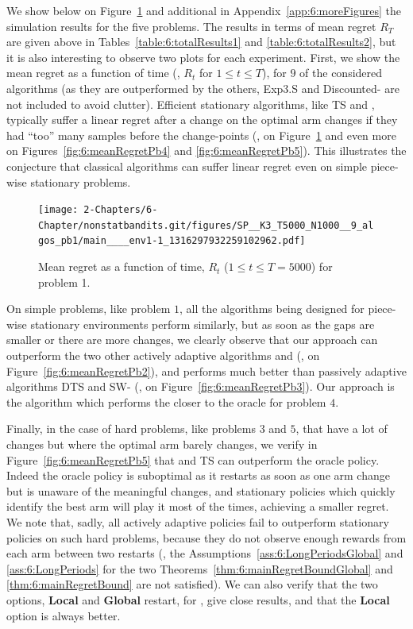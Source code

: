 We show below on Figure~\ref{fig:6:meanRegretPb1} and additional in Appendix~\ref{app:6:moreFigures} the simulation results for the five problems.
The results in terms of mean regret $R_T$ are given above in Tables~\ref{table:6:totalResults1} and \ref{table:6:totalResults2}, but it is also interesting to observe two plots for each experiment.
%
First, we show the mean regret as a function of time (\ie, $R_t$ for $1 \leq t \leq T$), for $9$ of the considered algorithms (as they are outperformed by the others, Exp3.S and Discounted-\klUCB{} are not included to avoid clutter).
%
Efficient stationary algorithms, like TS and \klUCB, typically suffer a linear regret after a change on the optimal arm changes if they had ``too'' many samples before the change-points (\eg, on Figure~\ref{fig:6:meanRegretPb1} and even more on Figures~\ref{fig:6:meanRegretPb4} and \ref{fig:6:meanRegretPb5}).
This illustrates the conjecture that classical algorithms can suffer linear regret even on simple piece-wise stationary problems.


\begin{figure}[h!]  %
    \centering
    \texttt{[image: 2-Chapters/6-Chapter/nonstatbandits.git/figures/SP\_\_K3\_T5000\_N1000\_\_9\_algos\_pb1/main\_\_\_\_env1-1\_1316297932259102962.pdf]}
    \caption{Mean regret as a function of time, $R_t$ ($1 \leq t \leq T = 5000$) for problem 1.}
    \label{fig:6:meanRegretPb1}
\end{figure}

On simple problems, like problem $1$, all the algorithms being designed for piece-wise stationary environments perform similarly, but as soon as the gaps are smaller or there are more changes, we clearly observe that our approach \GLRklUCB{} can outperform the two other actively adaptive algorithms \CUSUMklUCB{} and \MklUCB{} (\eg, on Figure~\ref{fig:6:meanRegretPb2}), and performs much better than passively adaptive algorithms DTS and SW-\klUCB{}  (\eg, on Figure~\ref{fig:6:meanRegretPb3}).
Our approach is the algorithm which performs the closer to the oracle for problem $4$.

Finally, in the case of hard problems, like problems $3$ and $5$, that have a lot of changes but where the optimal arm barely changes, we verify in Figure~\ref{fig:6:meanRegretPb5} that \klUCB{} and TS can outperform the oracle policy.
Indeed the oracle policy is suboptimal as it restarts as soon as one arm change but is unaware of the meaningful changes, and stationary policies which quickly identify the best arm will play it most of the times, achieving a smaller regret.
We note that, sadly, all actively adaptive policies fail to outperform stationary policies on such hard problems, because they do not observe enough rewards from each arm between two restarts (\ie, the Assumptions~\ref{ass:6:LongPeriodsGlobal} and \ref{ass:6:LongPeriods} for the two Theorems~\ref{thm:6:mainRegretBoundGlobal} and \ref{thm:6:mainRegretBound} are not satisfied).
We can also verify that the two options, \textbf{Local} and \textbf{Global} restart, for \GLRklUCB, give close results, and that the \textbf{Local} option is always better.

